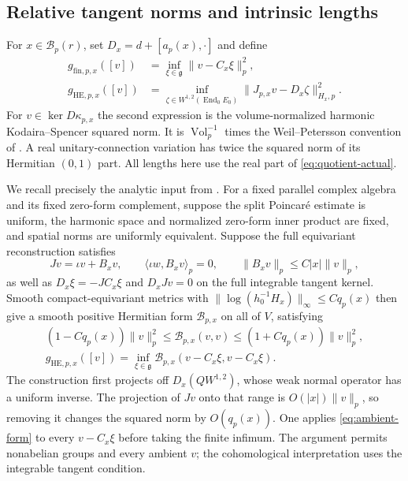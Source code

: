 \documentclass[11pt]{amsart}
\theoremstyle{definition}
\theoremstyle{remark}
\newcommand{\Vol}{\operatorname{Vol}}
\newcommand{\End}{\operatorname{End}}
\newcommand{\cB}{\mathcal B}
\begin{document}
\subsection{Relative tangent norms and intrinsic lengths}
For $x\in\cB_p(r)$, set $D_x=d+[a_p(x),\cdot]$ and define
\begin{align}
 g_{\mathrm{fin},p,x}([v])
 &=\inf_{\xi\in\mathfrak g}\|v-C_x\xi\|_p^2,\label{eq:quotient-finite}\\
 g_{\mathrm{HE},p,x}([v])
 &=\inf_{\zeta\in W^{1,2}(\End_0E_0)}
       \|J_{p,x}v-D_x\zeta\|_{H_x,p}^2.\label{eq:quotient-actual}
\end{align}
For $v\in\ker D\kappa_{p,x}$ the second expression is the
volume-normalized harmonic Kodaira--Spencer squared norm. It is
$\Vol_p^{-1}$ times the Weil--Petersson convention of
\cite[Section 4.1]{BiswasSchumacher16}. A real unitary-connection
variation has twice the squared norm of its Hermitian $(0,1)$ part.
All lengths here use the real part of \eqref{eq:quotient-actual}.

We recall precisely the analytic input from
\cite[Theorem 8.1]{WuebbenWallMetrics26}. For a fixed parallel complex
algebra and its fixed zero-form complement, suppose the split Poincar\'e
estimate is uniform, the harmonic space and normalized zero-form inner
product are fixed, and spatial norms are uniformly equivalent. Suppose
the full equivariant reconstruction satisfies
\[
 Jv=\iota v+B_xv,\qquad
 \langle\iota w,B_xv\rangle_p=0,\qquad
 \|B_xv\|_p\le C|x|\|v\|_p,
\]
as well as $D_x\xi=-JC_x\xi$ and $D_xJv=0$ on the full
integrable tangent kernel. Smooth compact-equivariant metrics with
$\|\log(h_0^{-1}H_x)\|_\infty\le Cq_p(x)$ then give a smooth
positive Hermitian form $\mathcal B_{p,x}$ on all of $V$, satisfying
\begin{gather}
 (1-Cq_p(x))\|v\|_p^2\le\mathcal B_{p,x}(v,v)
                  \le(1+Cq_p(x))\|v\|_p^2,\label{eq:ambient-form}\\
 g_{\mathrm{HE},p,x}([v])
 =\inf_{\xi\in\mathfrak g}
       \mathcal B_{p,x}(v-C_x\xi,v-C_x\xi).\label{eq:ambient-infimum}
\end{gather}
The construction first projects off $D_x(QW^{1,2})$, whose weak
normal operator has a uniform inverse. The projection of $Jv$ onto
that range is $O(|x|)\|v\|_p$, so removing it changes the squared
norm by $O(q_p(x))$. One applies \eqref{eq:ambient-form} to every
$v-C_x\xi$ before taking the finite infimum. The argument permits
nonabelian groups and every ambient $v$; the cohomological interpretation
uses the integrable tangent condition.
\end{document}
